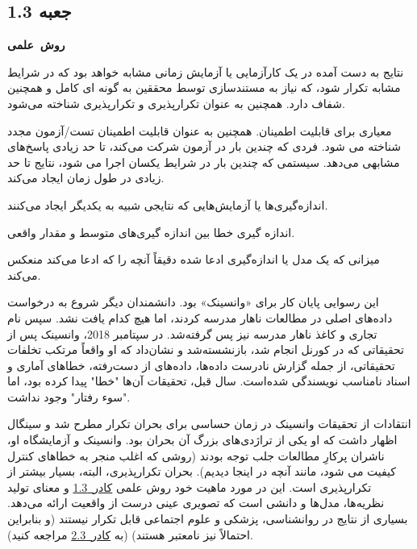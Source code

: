 \begin{tcolorbox}[colback=gray!10,colframe=black]

    \section*{جعبه 1.3}
    \label{sec:جعبه 1.3}
    \begin{Large}
        \textbf{\mbox{روش علمی}}
    \end{Large}
    \newline

    \begin{description}[leftmargin=0.5cm,style=nextline]
        \item[تکرارپذیری:] نتایج به دست آمده در یک کارآزمایی یا آزمایش زمانی مشابه خواهد بود که در شرایط مشابه تکرار شود، که نیاز به مستندسازی توسط محققین به گونه ای کامل و همچنین شفاف دارد.
        همچنین به عنوان تکرارپذیری و تکرارپذیری شناخته می‌شود.
        \item[قابلیت اطمینان:] معیاری برای قابلیت اطمینان.
        همچنین به عنوان قابلیت اطمینان تست/آزمون مجدد شناخته می شود.
        فردی که چندین بار در آزمون شرکت می‌کند، تا حد زیادی پاسخ‌های مشابهی می‌دهد.
        سیستمی که چندین بار در شرایط یکسان اجرا می شود، نتایج تا حد زیادی در طول زمان ایجاد می‌کند.
        \item[دقت:] اندازه‌گیری‌ها یا آزمایش‌هایی که نتایجی شبیه به یکدیگر ایجاد می‌کنند.
        \item[صحت:] اندازه گیری خطا بین اندازه گیری‌های متوسط و مقدار واقعی.
        \item[اعتبار:] میزانی که یک مدل یا اندازه‌گیری ادعا شده دقیقاً آنچه را که ادعا می‌کند منعکس می‌کند.
    \end{description}


\end{tcolorbox}


این رسوایی پایان کار برای «وانسینک» بود.
دانشمندان دیگر شروع به درخواست داده‌های اصلی در مطالعات ناهار مدرسه کردند، اما هیچ کدام یافت نشد.
سپس نام تجاری و کاغذ ناهار مدرسه نیز پس گرفته‌شد.
در سپتامبر 2018، وانسینک پس از تحقیقاتی که در کورنل انجام شد، بازنشسته‌شد و نشان‌داد که او واقعاً مرتکب تخلفات تحقیقاتی، از جمله گزارش نادرست داده‌ها، داده‌های از دست‌رفته، خطاهای آماری و اسناد نامناسب نویسندگی شده‌است.
سال قبل، تحقیقات آن‌ها "خطا" پیدا کرده بود، اما "سوء رفتار" وجود نداشت.

انتقادات از تحقیقات وانسینک در زمان حساسی برای بحران تکرار مطرح شد و سینگال اظهار داشت که او یکی از تراژدی‌های بزرگ آن بحران بود.
وانسینک و آزمایشگاه او، ناشران پرکارِ مطالعات جلب توجه بودند (روشی که اغلب منجر به خطاهای کنترل کیفیت می شود، مانند آنچه در اینجا دیدیم).
بحران تکرارپذیری، البته، بسیار بیشتر از تکرارپذیری است.
این در مورد ماهیت خود روش علمی \hyperref[sec:جعبه 1.3]{\mbox{کادر 1.3}} و معنای تولید نظریه‌ها، مدل‌ها و دانشی است که تصویری عینی درست از واقعیت ارائه می‌دهد.
بسیاری از نتایج در روانشناسی، پزشکی و علوم اجتماعی قابل تکرار نیستند (و بنابراین احتمالاً نیز نامعتبر هستند) (به \hyperref[sec:جعبه 2.3]{\mbox{کادر 2.3}} مراجعه کنید).

